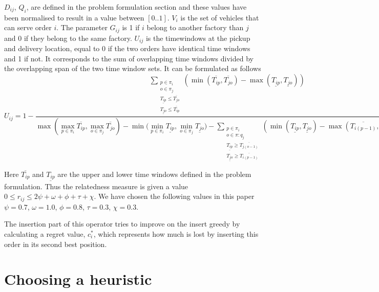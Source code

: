 \documentclass[../main.tex]{subfiles}
\begin{document}
$D_{ij}$, $Q_i$, are defined in the problem formulation section and these values have been normalised to result in a value between $[0..1]$. 
$V_i$ is the set of vehicles that can serve order $i$. 
The parameter $G_{ij}$ is 1 if $i$ belong to another factory than $j$ and 0 if they belong to the same factory. 
$U_{ij}$ is the timewindows at the pickup and delivery location, equal to 0 if the two orders have identical time windows and 1 if not. It corresponds to the sum of overlapping time windows divided by the overlapping span of the two time window sets.
It can be formulated as follows
\begin{equation}
    \label{overlaptime}
    U_{ij} = 1 - 
\dfrac{ 
    \sum\limits_{\substack{p\in \pi_i\\ o\in \pi_j\\ \underline{T_{ip}}\leq \overline{T_{jo}}\\ \underline{T_{jo}}\leq\overline{T_{ip}}}} 
    (\min(\overline{T_{ip}}, \overline{T_{jo}}) - \max(\underline{T_{ip}},\underline{T_{jo}}) )
    }
    {\max{(\max\limits_{p\in \pi_i} \overline{T_{ip}}, \max\limits_{o\in \pi_j} \overline{T_{jo}})} - 
    \min{(\min\limits_{p\in \pi_i} \underline{T_{ip}}, \min\limits_{o\in \pi_j} \underline{T_{jo}}}) -     
    \sum\limits_{\substack{p\in \pi_i\\ o\in \pi:q_j\\ \underline{T_{ip}}\geq \overline{T_{j(o-1)}}\\ \underline{T_{jo}}\geq\overline{T_{i(p-1)}}}} 
    (\min(\underline{T_{ip}}, \underline{T_{jo}}) - \max(\overline{T_{i(p-1)}},\overline{T_{j(o-1)}}) ) 
    }
\end{equation}

Here $\overline{T_{ip}}$ and $\underline{T_{ip}}$ are the upper and lower time windows defined in the problem formulation.
Thus the relatedness measure is given a value $0\leq r_{ij} \leq 2\psi + \omega + \phi + \tau  + \chi$. 
We have chosen the following values in this paper $\psi=0.7$, $\omega=1.0$, $\phi=0.8$, $\tau=0.3$, $\chi = 0.3$. \newline\par
The insertion part of this operator tries to improve on the insert greedy by calculating a regret value, $c^*_i$, which represents how much is lost by inserting this order in its second best position.

\section{Choosing a heuristic}
\label{sec:choos}
\end{document}
